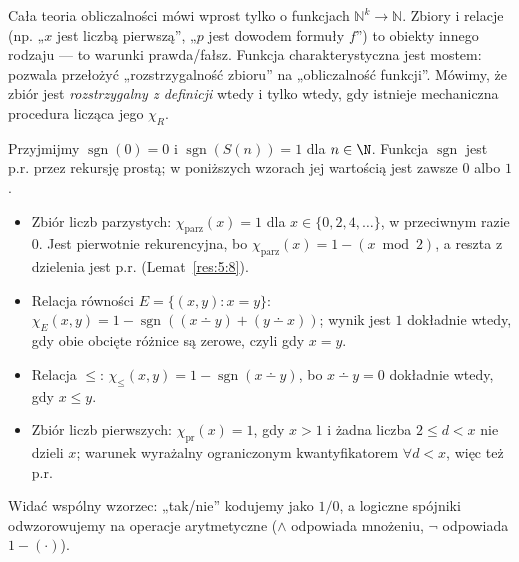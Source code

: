 \begin{uwaga}\label{res:5:3}
Cała teoria obliczalności mówi wprost tylko o funkcjach $\mathbb N^k\to\mathbb N$. Zbiory i relacje (np. „$x$ jest liczbą pierwszą”, „$p$ jest dowodem formuły $f$”) to obiekty innego rodzaju --- to warunki prawda/fałsz. Funkcja charakterystyczna jest mostem: pozwala przełożyć „rozstrzygalność zbioru” na „obliczalność funkcji”. Mówimy, że zbiór jest \emph{rozstrzygalny z definicji} wtedy i tylko wtedy, gdy istnieje mechaniczna procedura licząca jego $\chi_R$.
\end{uwaga}

\begin{przyklad}\label{res:5:4}
Przyjmijmy $\operatorname{sgn}(0)=0$ i $\operatorname{sgn}(S(n))=1$ dla $n\in\N$.
Funkcja $\operatorname{sgn}$ jest p.r. przez rekursję prostą; w poniższych wzorach
jej wartością jest zawsze $0$ albo $1$.
\begin{itemize}
\item Zbiór liczb parzystych: $\chi_{\mathrm{parz}}(x)=1$ dla $x\in\{0,2,4,\ldots\}$, w przeciwnym razie $0$. Jest pierwotnie rekurencyjna, bo $\chi_{\mathrm{parz}}(x)=1-(x\bmod 2)$, a reszta z dzielenia jest p.r. (Lemat~\ref{res:5:8}).
\item Relacja równości $E=\{(x,y):x=y\}$: $\chi_E(x,y)=1-\operatorname{sgn}((x\dotminus y)+(y\dotminus x))$; wynik jest $1$ dokładnie wtedy, gdy obie obcięte różnice są zerowe, czyli gdy $x=y$.
\item Relacja $\le$: $\chi_{\le}(x,y)=1-\operatorname{sgn}(x\dotminus y)$, bo $x\dotminus y=0$ dokładnie wtedy, gdy $x\le y$.
\item Zbiór liczb pierwszych: $\chi_{\mathrm{pr}}(x)=1$, gdy $x>1$ i żadna liczba $2\le d<x$ nie dzieli $x$; warunek wyrażalny ograniczonym kwantyfikatorem $\forall d<x$, więc też p.r.
\end{itemize}
Widać wspólny wzorzec: „tak/nie” kodujemy jako $1/0$, a logiczne spójniki odwzorowujemy na operacje arytmetyczne ($\land$ odpowiada mnożeniu, $\neg$ odpowiada $1-(\cdot)$).
\end{przyklad}

